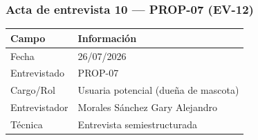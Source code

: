 \documentclass[journal,onecolumn]{IEEEtran}
\begin{document}
	
	\subsubsection*{Acta de entrevista 10 --- PROP-07 (EV-12)}
	
	\begin{table}[H]
		\centering\small
		\begin{tabularx}{\textwidth}{@{}l X@{}}
			\toprule
			\textbf{Campo} & \textbf{Información} \\
			\midrule
			
			Fecha & 26/07/2026 \\
			
			Entrevistado & PROP-07 \\
			
			Cargo/Rol & Usuaria potencial (dueña de mascota) \\
			
			Entrevistador & Morales Sánchez Gary Alejandro \\
			
			Técnica & Entrevista semiestructurada \\
			
			\bottomrule
		\end{tabularx}
	\end{table}
	
\end{document}
